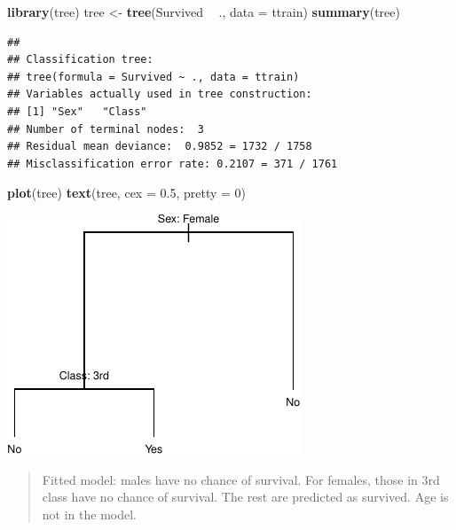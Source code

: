 \documentclass[]{article}
\newenvironment{Shaded}{\begin{snugshade}}{\end{snugshade}}
\newcommand{\DataTypeTok}[1]{\textcolor[rgb]{0.13,0.29,0.53}{#1}}
\newcommand{\DecValTok}[1]{\textcolor[rgb]{0.00,0.00,0.81}{#1}}
\newcommand{\FloatTok}[1]{\textcolor[rgb]{0.00,0.00,0.81}{#1}}
\newcommand{\KeywordTok}[1]{\textcolor[rgb]{0.13,0.29,0.53}{\textbf{#1}}}
\newcommand{\NormalTok}[1]{#1}
\newcommand{\OperatorTok}[1]{\textcolor[rgb]{0.81,0.36,0.00}{\textbf{#1}}}
\newcommand{\StringTok}[1]{\textcolor[rgb]{0.31,0.60,0.02}{#1}}
\begin{document}
\begin{Shaded}
\begin{Highlighting}[]
\KeywordTok{library}\NormalTok{(tree)}
\NormalTok{tree <-}\StringTok{ }\KeywordTok{tree}\NormalTok{(Survived }\OperatorTok{~}\StringTok{ }\NormalTok{., }\DataTypeTok{data =}\NormalTok{ ttrain)}
\KeywordTok{summary}\NormalTok{(tree)}
\end{Highlighting}
\end{Shaded}

\begin{verbatim}
## 
## Classification tree:
## tree(formula = Survived ~ ., data = ttrain)
## Variables actually used in tree construction:
## [1] "Sex"   "Class"
## Number of terminal nodes:  3 
## Residual mean deviance:  0.9852 = 1732 / 1758 
## Misclassification error rate: 0.2107 = 371 / 1761
\end{verbatim}

\begin{Shaded}
\begin{Highlighting}[]
\KeywordTok{plot}\NormalTok{(tree)}
\KeywordTok{text}\NormalTok{(tree, }\DataTypeTok{cex =} \FloatTok{0.5}\NormalTok{, }\DataTypeTok{pretty =} \DecValTok{0}\NormalTok{)}
\end{Highlighting}
\end{Shaded}

\begin{center}\includegraphics{sol_A4_files/figure-latex/unnamed-chunk-20-1} \end{center}

\begin{quote}
Fitted model: males have no chance of survival. For females, those in
3rd class have no chance of survival. The rest are predicted as
survived. Age is not in the model.
\end{quote}
\end{document}
